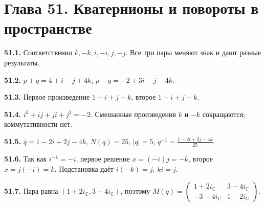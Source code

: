 \documentclass[12pt,a4paper,oneside,openany]{book}
\theoremstyle{colordef}\newtheorem{definition}{Определение}[chapter]
\theoremstyle{plain}\newtheorem{theorem}{Теорема}[chapter]
\theoremstyle{definition}\newtheorem{axiom}{Аксиома}[chapter]
\begin{document}
\section*{Глава 51. Кватернионы и повороты в пространстве}
\begingroup\setlength{\parskip}{3pt}
\textbf{51.1.} Соответственно \(k,-k,i,-i,j,-j\). Все три пары меняют знак и дают разные результаты.\par
\textbf{51.2.} \(p+q=4+i-j+4k\), \(p-q=-2+3i-j-4k\).\par
\textbf{51.3.} Первое произведение \(1+i+j+k\), второе \(1+i+j-k\).\par
\textbf{51.4.} \(i^2+ij+ji+j^2=-2\). Смешанные произведения \(k\) и \(-k\) сокращаются; коммутативности нет.\par
\textbf{51.5.} \(\overline q=1-2i+2j-4k\), \(N(q)=25\), \(|q|=5\), \(q^{-1}=\frac{1-2i+2j-4k}{25}\).\par
\textbf{51.6.} Так как \(i^{-1}=-i\), первое решение \(x=(-i)j=-k\), второе \(x=j(-i)=k\). Подстановка даёт \(i(-k)=j\), \(ki=j\).\par
\textbf{51.7.} Пара равна \((1+2i_{\mathbb C},3-4i_{\mathbb C})\), поэтому \(M(q)=\begin{pmatrix}1+2i_{\mathbb C}&3-4i_{\mathbb C}\\-3-4i_{\mathbb C}&1-2i_{\mathbb C}\end{pmatrix}\).\par
\end{document}
